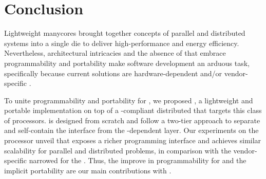 \section{Conclusion}
\label{sec:conclusions}

	Lightweight manycores brought together concepts of parallel and
	distributed systems into a single die to deliver high-performance and
	energy efficiency.  Nevertheless, architectural intricacies and the
	absence of \apis that embrace programmability and portability
	make software development an arduous task, specifically because
	current solutions are hardware-dependent and/or vendor-specific \apis.

	To unite programmability and portability for \lws,
	we proposed \lwmpi, a lightweight and portable \mpi implementation on
	top of a \posix-compliant distributed \os that targets this class of
	processors. \lwmpi is designed from scratch and follow a two-tier
	approach to separate and self-contain the \mpi interface from the
	\os-dependent layer.
	Our experiments on the \mppa processor
	unveil that \lwmpi exposes a richer programming interface and
	achieves similar scalability for parallel and distributed problems, in
	comparison with the vendor-specific \api narrowed for the \mppa.
	Thus, the improve in programmability for \lws and the implicit portability
	are our main contributions with \lwmpi.

